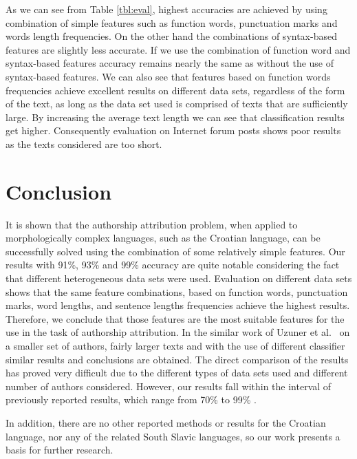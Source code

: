 \documentclass{llncs}
\begin{document}
As we can see from Table \ref{tbl:eval}, highest accuracies are achieved by
using combination of simple features such as function words, punctuation marks
and words length frequencies. On the other hand the combinations of syntax-based features are
slightly less accurate. If we use the combination of function word and
syntax-based features accuracy remains nearly the same as without the use of syntax-based
features. We can also see that features based on function
words frequencies achieve excellent results on different data sets, regardless
of the form of the text, as long as the data set used is comprised of texts that
are sufficiently large. By increasing the average text length we can
see that classification results get higher. Consequently evaluation
on Internet forum posts shows poor results as the texts considered are too short.

\section{Conclusion}
It is shown that the authorship attribution problem, when applied to
morphologically complex languages, such as the Croatian language, can be
successfully solved using the combination of some relatively simple features. Our
results with 91\%, 93\% and 99\% accuracy are quite notable considering the fact
that different heterogeneous data sets were used. Evaluation on different data
sets shows that the same feature combinations, based on function words,
punctuation marks, word lengths, and sentence lengths frequencies achieve the
highest results. Therefore, we conclude that those
features are the most suitable features for the use in the task of authorship
attribution. In the similar work of Uzuner et al.\ \cite{uzuner2005comparative}
on a smaller set of authors, fairly larger texts and with the use of
different classifier similar results and conclusions are obtained. The direct comparison of
the results has proved very difficult due to the different types of data sets
used  and different number of authors considered. However, our results fall
within the interval of previously reported results, which range from 70\% to 99\%
\cite{argamon2005measuring,coyotl2006authorship,keselj2003n,luyckx2005shallow,stamatatos2001computer,uzuner2005comparative}.

In addition, there are no other reported methods or results for the Croatian
language, nor any of the related South Slavic languages, so our work presents a
basis for further research.
\end{document}
